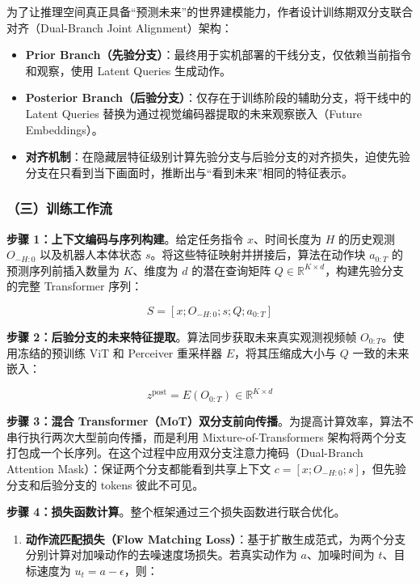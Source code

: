 为了让推理空间真正具备``预测未来''的世界建模能力，作者设计训练期双分支联合对齐（Dual-Branch Joint Alignment）架构：

\begin{itemize}
\tightlist
\item
  \textbf{Prior Branch（先验分支）}：最终用于实机部署的干线分支，仅依赖当前指令和观察，使用 Latent Queries 生成动作。
\item
  \textbf{Posterior Branch（后验分支）}：仅存在于训练阶段的辅助分支，将干线中的 Latent Queries 替换为通过视觉编码器提取的未来观察嵌入（Future Embeddings）。
\item
  \textbf{对齐机制}：在隐藏层特征级别计算先验分支与后验分支的对齐损失，迫使先验分支在只看到当下画面时，推断出与``看到未来''相同的特征表示。
\end{itemize}

\hypertarget{ux4e09ux8badux7ec3ux5de5ux4f5cux6d41-4}{%
\subsubsection{（三）训练工作流}\label{ux4e09ux8badux7ec3ux5de5ux4f5cux6d41-4}}

\textbf{步骤 1：上下文编码与序列构建}。给定任务指令 \(x\)、时间长度为 \(H\) 的历史观测 \(O_{-H:0}\) 以及机器人本体状态 \(s\)。将这些特征映射并拼接后，算法在动作块 \(a_{0:T}\) 的预测序列前插入数量为 \(K\)、维度为 \(d\) 的潜在查询矩阵 \(Q \in \mathbb{R}^{K \times d}\)，构建先验分支的完整 Transformer 序列：

\[
S = \left[x; O_{-H:0}; s; Q; a_{0:T}\right]
\]

\textbf{步骤 2：后验分支的未来特征提取}。算法同步获取未来真实观测视频帧 \(O_{0:T}\)。使用冻结的预训练 ViT 和 Perceiver 重采样器 \(E\)，将其压缩成大小与 \(Q\) 一致的未来嵌入：

\[
z^{\mathrm{post}} = E(O_{0:T}) \in \mathbb{R}^{K \times d}
\]

\textbf{步骤 3：混合 Transformer（MoT）双分支前向传播}。为提高计算效率，算法不串行执行两次大型前向传播，而是利用 Mixture-of-Transformers 架构将两个分支打包成一个长序列。在这个过程中应用双分支注意力掩码（Dual-Branch Attention Mask）：保证两个分支都能看到共享上下文 \(c=[x;O_{-H:0};s]\)，但先验分支和后验分支的 tokens 彼此不可见。

\textbf{步骤 4：损失函数计算}。整个框架通过三个损失函数进行联合优化。

\begin{enumerate}
\def\labelenumi{\arabic{enumi}.}
\tightlist
\item
  \textbf{动作流匹配损失（Flow Matching Loss）}：基于扩散生成范式，为两个分支分别计算对加噪动作的去噪速度场损失。若真实动作为 \(a\)、加噪时间为 \(t\)、目标速度为 \(u_t=a-\epsilon\)，则：
\end{enumerate}

